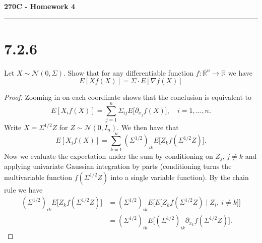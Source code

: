 \documentclass[11pt,letterpaper]{report}
\newcommand{\reals}{\mathbb{R}}
\newcommand{\mcal}[1]{\mathcal{#1}}
\begin{document}
\begin{center}
{\bf \Large 270C - Homework 4}
\vspace{0.2cm}
\hrule
\end{center}


\section*{7.2.6}
Let $X\sim \mcal{N}(0, \Sigma)$. Show that for any differentiable function $f:\reals^n\to \reals$ we have
\[
E[Xf(X)] = \Sigma\cdot E[\nabla f(X)]
\]
\begin{proof}
	Zooming in on each coordinate shows that the conclusion is equivalent to
	\[
	E[X_if(X)] = \sum_{j=1}^n\Sigma_{ij}E\big[\partial_{x_j}f(X)\big],\quad i=1, \ldots, n.
	\]
	Write $X = \Sigma^{1/2}Z$ for $Z\sim \mcal{N}(0, I_n)$. We then have that
	\[
	E[X_i f(X)] = \sum_{k=1}^n(\Sigma^{1/2})_{ik}E\big[Z_kf(\Sigma^{1/2}Z)\big].
	\]
	Now we evaluate the expectation under the sum by conditioning on $Z_j$, $j\neq k$ and applying univariate Gaussian integration by parts (conditioning turns the multivariable function $f(\Sigma^{1/2}Z)$ into a single variable function). By the chain rule we have
	\begin{align*}
		(\Sigma^{1/2})_{ik}E\big[Z_kf(\Sigma^{1/2}Z)\big] &= (\Sigma^{1/2})_{ik}E\bigg[E\big[Z_kf(\Sigma^{1/2}Z)\mid Z_i,\ i\neq k\big]\bigg]\\
		&= (\Sigma^{1/2})_{ik}E\big[(\Sigma^{1/2})_{ik}\partial_{x_k}f(\Sigma^{1/2}Z)\big].
	\end{align*}
\end{proof}
\end{document}
